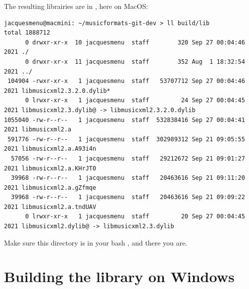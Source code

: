 The resulting librairies are in , here on MacOS:
\begin{lstlisting}[language=Terminal]
jacquesmenu@macmini: ~/musicformats-git-dev > ll build/lib
total 1888712
      0 drwxr-xr-x  10 jacquesmenu  staff        320 Sep 27 00:04:46 2021 ./
      0 drwxr-xr-x  11 jacquesmenu  staff        352 Aug  1 18:32:54 2021 ../
 104904 -rwxr-xr-x   1 jacquesmenu  staff   53707712 Sep 27 00:04:46 2021 libmusicxml2.3.2.0.dylib*
      0 lrwxr-xr-x   1 jacquesmenu  staff         24 Sep 27 00:04:45 2021 libmusicxml2.3.dylib@ -> libmusicxml2.3.2.0.dylib
1055040 -rw-r--r--   1 jacquesmenu  staff  532838416 Sep 27 00:04:41 2021 libmusicxml2.a
 591776 -rw-r--r--   1 jacquesmenu  staff  302989312 Sep 21 09:05:55 2021 libmusicxml2.a.A93i4n
  57056 -rw-r--r--   1 jacquesmenu  staff   29212672 Sep 21 09:01:27 2021 libmusicxml2.a.KHrJT0
  39968 -rw-r--r--   1 jacquesmenu  staff   20463616 Sep 21 09:11:20 2021 libmusicxml2.a.gZfmqe
  39968 -rw-r--r--   1 jacquesmenu  staff   20463616 Sep 21 09:09:22 2021 libmusicxml2.a.tndUAV
      0 lrwxr-xr-x   1 jacquesmenu  staff         20 Sep 27 00:04:45 2021 libmusicxml2.dylib@ -> libmusicxml2.3.dylib
\end{lstlisting}

Make sure this  directory is in your bash , and there you are.


\section{Building the library on Windows\texttrademark}

